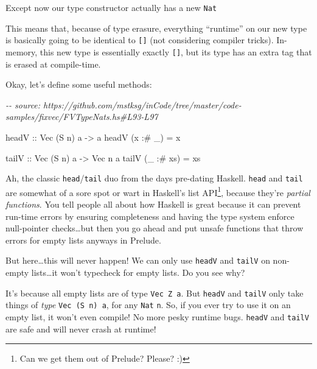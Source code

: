 \documentclass[]{article}
\newenvironment{Shaded}{}{}
\newcommand{\CommentTok}[1]{\textcolor[rgb]{0.38,0.63,0.69}{\textit{#1}}}
\newcommand{\DataTypeTok}[1]{\textcolor[rgb]{0.56,0.13,0.00}{#1}}
\newcommand{\NormalTok}[1]{#1}
\newcommand{\OperatorTok}[1]{\textcolor[rgb]{0.40,0.40,0.40}{#1}}
\newcommand{\OtherTok}[1]{\textcolor[rgb]{0.00,0.44,0.13}{#1}}
\begin{document}
Except now our type constructor actually has a new \texttt{Nat}

This means that, because of type erasure, everything ``runtime'' on our new type
is basically going to be identical to \texttt{{[}{]}} (not considering compiler
tricks). In-memory, this new type is essentially exactly \texttt{{[}{]}}, but
its type has an extra tag that is erased at compile-time.

Okay, let's define some useful methods:

\begin{Shaded}
\begin{Highlighting}[]
\CommentTok{{-}{-} source: https://github.com/mstksg/inCode/tree/master/code{-}samples/fixvec/FVTypeNats.hs\#L93{-}L97}

\OtherTok{headV ::} \DataTypeTok{Vec}\NormalTok{ (}\DataTypeTok{S}\NormalTok{ n) a }\OtherTok{{-}\textgreater{}}\NormalTok{ a}
\NormalTok{headV (x }\OperatorTok{:\#}\NormalTok{ \_)  }\OtherTok{=}\NormalTok{ x}

\OtherTok{tailV ::} \DataTypeTok{Vec}\NormalTok{ (}\DataTypeTok{S}\NormalTok{ n) a }\OtherTok{{-}\textgreater{}} \DataTypeTok{Vec}\NormalTok{ n a}
\NormalTok{tailV (\_ }\OperatorTok{:\#}\NormalTok{ xs) }\OtherTok{=}\NormalTok{ xs}
\end{Highlighting}
\end{Shaded}

Ah, the classic \texttt{head}/\texttt{tail} duo from the days pre-dating
Haskell. \texttt{head} and \texttt{tail} are somewhat of a sore spot or wart in
Haskell's list API\footnote{Can we get them out of Prelude? Please? :)}, because
they're \emph{partial functions}. You tell people all about how Haskell is great
because it can prevent run-time errors by ensuring completeness and having the
type system enforce null-pointer checks\ldots but then you go ahead and put
unsafe functions that throw errors for empty lists anyways in Prelude.

But here\ldots this will never happen! We can only use \texttt{headV} and
\texttt{tailV} on non-empty lists\ldots it won't typecheck for empty lists. Do
you see why?

It's because all empty lists are of type \texttt{Vec\ Z\ a}. But \texttt{headV}
and \texttt{tailV} only take things of \emph{type} \texttt{Vec\ (S\ n)\ a}, for
any \texttt{Nat} \texttt{n}. So, if you ever try to use it on an empty list, it
won't even compile! No more pesky runtime bugs. \texttt{headV} and
\texttt{tailV} are safe and will never crash at runtime!
\end{document}
